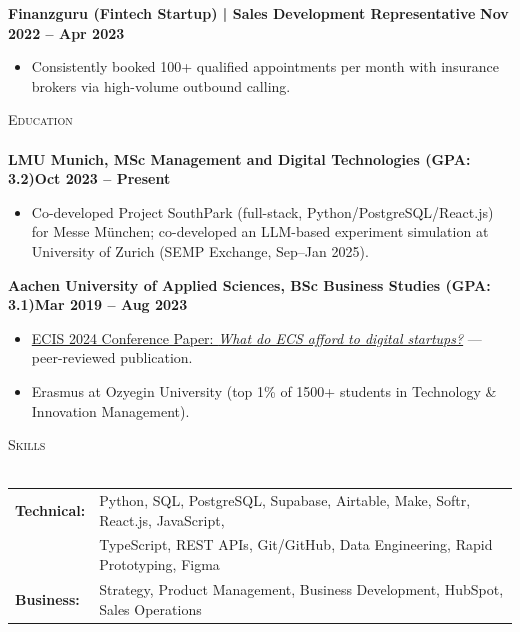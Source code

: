\documentclass[a4paper]{article}
\newcommand{\lineunder} {
    \vspace*{-8pt} \\
    \hspace*{-18pt} \hrulefill \\
}
\newcommand{\header} [1] {
    {\hspace*{-18pt}\vspace*{6pt} \textsc{#1}}
    \vspace*{-6pt} \lineunder
}
\begin{document}
\vspace{-1mm}
\textbf{Finanzguru (Fintech Startup) | Sales Development Representative} \hfill \textbf{Nov 2022 -- Apr 2023}\\
\vspace{-2mm}
\begin{itemize} \itemsep -2pt
    \item Consistently booked 100+ qualified appointments per month with insurance brokers via high-volume outbound calling.
\end{itemize}

\header{Education}
\textbf{LMU Munich, MSc Management and Digital Technologies (GPA: 3.2)}\hfill \textbf{Oct 2023 -- Present}\\
\vspace{-2mm}
\begin{itemize} \itemsep -2pt
	\item Co-developed Project SouthPark (full-stack, Python/PostgreSQL/React.js) for Messe München; co-developed an LLM-based experiment simulation at University of Zurich (SEMP Exchange, Sep--Jan 2025).
\end{itemize}
\vspace{-2mm}
\textbf{Aachen University of Applied Sciences, BSc Business Studies (GPA: 3.1)}\hfill \textbf{Mar 2019 -- Aug 2023}\\
\vspace{-2mm}
\begin{itemize} \itemsep -2pt
	\item \href{https://aisel.aisnet.org/ecis2024/track24_socialmedia/track24_socialmedia/6/}{ECIS 2024 Conference Paper: \textit{What do ECS afford to digital startups?}} --- peer-reviewed publication.
	\item Erasmus at Ozyegin University (top 1\% of 1500+ students in Technology \& Innovation Management).
\end{itemize}
\vspace{1mm}

\header{Skills}
\vspace{1mm}
\begin{tabular}{ l l }
	\textbf{Technical:} & Python, SQL, PostgreSQL, Supabase, Airtable, Make, Softr, React.js, JavaScript, \\
	 & TypeScript, REST APIs, Git/GitHub, Data Engineering, Rapid Prototyping, Figma \\
    \textbf{Business:} & Strategy, Product Management, Business Development, HubSpot, Sales Operations \\
\end{tabular}
\vspace{1mm}
\end{document}
